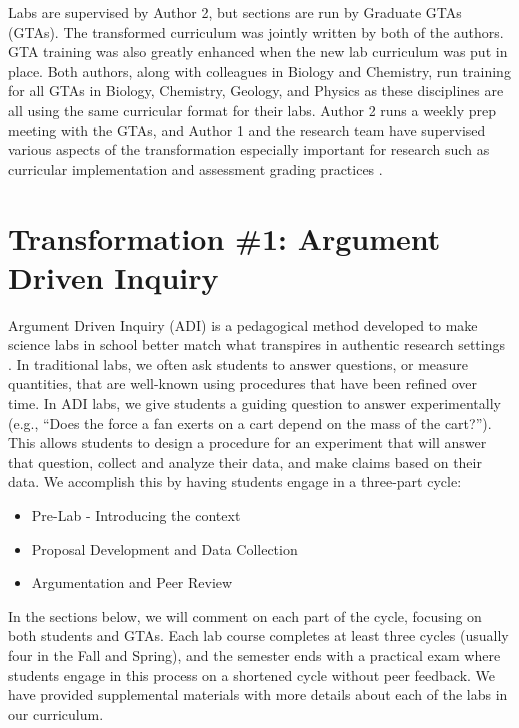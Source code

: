 \documentclass[aip, numerical, preprint]{revtex4-2}
\begin{document}
Labs are supervised by Author 2, but sections are run by Graduate GTAs (GTAs). The
transformed curriculum was jointly written by both of the authors.  GTA training was also greatly
enhanced when the new lab curriculum was put in place.  Both authors, along with colleagues in
Biology and Chemistry, run training for all GTAs in Biology, Chemistry, Geology, and Physics
as these disciplines are all using the same curricular format for their labs.  Author 2 runs a
weekly prep meeting with the GTAs, and Author 1 and the research team have supervised various
aspects of the transformation especially important for research such as curricular
implementation \citep{SmithJoyner2020} and assessment grading practices \citep{Wolf2019mask}.

\section{Transformation \#1: Argument Driven Inquiry}
Argument Driven Inquiry (ADI) is a pedagogical method developed to make science labs
in school better match what transpires in authentic research settings
\citep{Walker2011,Sampson2011,Walker2016}.  In traditional labs, we often ask students to
answer questions, or measure quantities, that are well-known using procedures that have been
refined over time.  In ADI labs, we give students a guiding question to answer experimentally
(e.g., ``Does the force a fan exerts on a cart depend on the mass of the cart?''). This allows
students to design a procedure for an experiment that will answer that question, collect and
analyze their data, and make claims based on their data.  We accomplish this by having students
engage in a three-part cycle:
\begin{itemize}
  \item Pre-Lab - Introducing the context
  \item Proposal Development and Data Collection
  \item Argumentation and Peer Review
\end{itemize}
In the sections below, we will comment on each part of the cycle, focusing on both students and
GTAs. Each lab course completes at least three cycles (usually four in the Fall and Spring),
and the semester ends with a practical exam where students engage in this process on a
shortened cycle without peer feedback.\cite{Wolf2019mask} We have provided supplemental materials
with more details about each of the labs in our curriculum.
\end{document}
